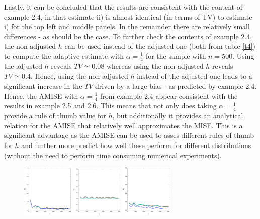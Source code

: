 \documentclass[
twoside,
openright,
titlepage,
numbers=noenddot,
headinclude,%
footinclude=true,
dottedtoc, %
ngerman,
american, %
pagesize=pdftex,
]{book}
\begin{document}
\begin{example}
		Lastly, it can be concluded that the results are consistent with the content of example 2.4, in that estimate ii) is almost identical (in terms of TV) to estimate i) for the top left and middle panels. In the remainder there are relatively small differences - as should be the case. To further check the contents of example 2.4, the non-adjusted $h$ can be used instead of the adjusted one (both from table \ref{t4}) to compute the adaptive estimate with $\alpha=\frac{1}{4}$ for the sample with $n=500$. Using the adjusted $h$ reveals $TV\simeq 0.08$ whereas using the non-adjusted $h$ reveals $TV\simeq 0.4$. Hence, using the non-adjusted $h$ instead of the adjusted one leads to a significant increase in the $TV$ driven by a large bias - as predicted by example 2.4. Hence, the AMISE with $\alpha=\frac{1}{4}$ from example 2.4 appear consistent with the results in example 2.5 and 2.6. This means that not only does taking $\alpha=\frac{1}{4}$ provide a rule of thumb value for $h$, but additionally it provides an analytical relation for the AMISE that relatively well approximates the MISE. This is a significant advantage as the AMISE can be used to asses different rules of thumb for $h$ and further more predict how well these perform for different distributions (without the need to perform time consuming numerical experiments).
		\begin{figure}[H]
			\centering
			\captionsetup{width=0.95\textwidth}
			\includegraphics[width=0.22\textwidth]{figures/1DTVexamples/e2n1}
			\includegraphics[width=0.22\textwidth]{figures/1DTVexamples/e2n2}
			\includegraphics[width=0.22\textwidth]{figures/1DTVexamples/e2t1}

\end{figure}
\end{example}
\end{document}
